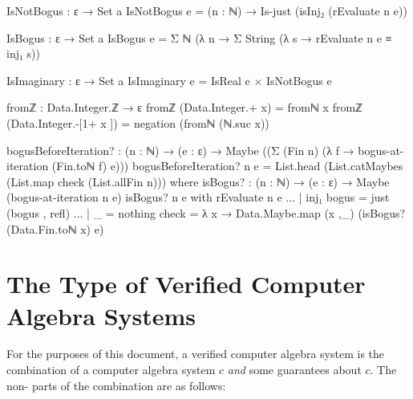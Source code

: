 \documentclass{report}
\begin{document}
\begin{code}
  IsNotBogus : ε → Set a
  IsNotBogus e = (n : ℕ) → Is-just (isInj₂ (rEvaluate n e))

  IsBogus : ε → Set a
  IsBogus e = Σ ℕ (λ n → Σ String (λ s → rEvaluate n e ≡ inj₁ s))

  IsImaginary : ε → Set a
  IsImaginary e = IsReal e × IsNotBogus e

  fromℤ : Data.Integer.ℤ → ε
  fromℤ (Data.Integer.+ x) = fromℕ x
  fromℤ (Data.Integer.-[1+ x ]) = negation (fromℕ (ℕ.suc x))

  bogusBeforeIteration? :
    (n : ℕ) →
    (e : ε) →
    Maybe ((Σ (Fin n) (λ f → bogus-at-iteration (Fin.toℕ f) e)))
  bogusBeforeIteration? n e =
    List.head (List.catMaybes (List.map check (List.allFin n)))
    where
    isBogus? : (n : ℕ) → (e : ε) → Maybe (bogus-at-iteration n e)
    isBogus? n e with rEvaluate n e
    ... | inj₁ bogus = just (bogus , refl)
    ... | _ = nothing
    check = λ x → Data.Maybe.map (x ,_) (isBogus? (Data.Fin.toℕ x) e)
\end{code}

\chapter{The Type of Verified Computer Algebra Systems}
For the purposes of this document, a verified computer algebra system is the combination of a  computer algebra system \(c\) \emph{and} some guarantees about \(c\).  The non- parts of the combination are as follows:
\end{document}
